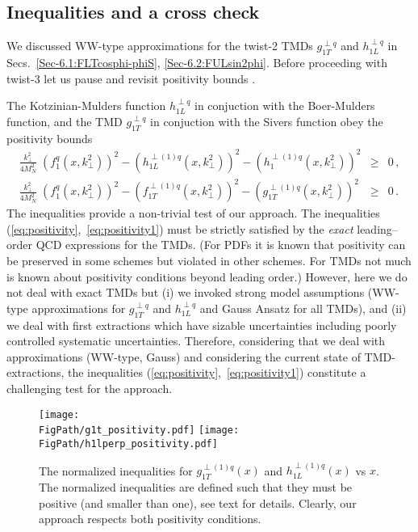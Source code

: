 \documentclass[a4paper,11pt]{article}
\newcommand{\blue}[1]{{\color{blue} #1}}
\newcommand{\ba}{\begin{eqnarray}}
\newcommand{\ea}{\end{eqnarray}}
\newcommand{\ps}[1]{\blue{ #1}}
\def\kperp{k_\perp}
\newcommand*{\FigPath}{./figs}%
\begin{document}
\ps{

\subsection{Inequalities and a cross check}

We discussed WW-type approximations for the twist-2 TMDs
$g^{\perp q}_{1T}$ and $h^{\perp q}_{1L}$ 
in Secs.~\ref{Sec-6.1:FLTcosphi-phiS}, \ref{Sec-6.2:FULsin2phi}.
Before proceeding with twist-3 let us pause and revisit positivity 
bounds \cite{Bacchetta:1999kz}. %

The Kotzinian-Mulders function $h^{\perp q}_{1L}$ in conjuction with 
the Boer-Mulders function, and the TMD $g^{\perp q}_{1T}$ in conjuction 
with the Sivers function obey the positivity bounds 
\cite{Bacchetta:1999kz}
\begin{subequations}\ba
	\frac{\kperp^2}{4M_N^2}\;(f_{1}^{q}(x,\kperp^2))^2 
	- (h^{\perp(1)q}_{1L}(x,\kperp^2))^2 
	- (h_{1}^{\perp(1)q}(x,\kperp^2))^2
	& \ge & 0\,, \label{eq:positivity}\\
	\frac{\kperp^2}{4M_N^2}\;(f_{1}^{q}(x,\kperp^2))^2 
	- (f_{1T}^{\perp(1)q}(x,\kperp^2))^2
	- (g^{\perp(1)q}_{1T}(x,\kperp^2))^2 
	& \ge & 0\,. \label{eq:positivity1}
\ea\end{subequations}
The inequalities provide a non-trivial test of our approach.
The inequalities (\ref{eq:positivity},~\ref{eq:positivity1}) 
must be strictly satisfied by the {\it exact} leading--order QCD 
expressions for the TMDs.  
(For PDFs it is known that positivity can be preserved in some 
schemes but violated in other schemes. For TMDs not much is 
known about positivity conditions beyond leading order.)
However, here we do not deal with exact TMDs but (i) we invoked 
strong model assumptions (WW-type approximations for $g^{\perp q}_{1T}$ 
and $h^{\perp q}_{1L}$ and Gauss Ansatz for all TMDs), and (ii) we deal 
with first extractions which have sizable uncertainties including 
poorly controlled systematic uncertainties.
Therefore, considering that we deal with approximations 
(WW-type, Gauss) and considering the current state of TMD-extractions, 
the inequalities (\ref{eq:positivity},~\ref{eq:positivity1}) constitute
a challenging test for the approach.

\begin{figure}[b!]
\centering
\texttt{[image: \\FigPath/g1t\_positivity.pdf]}  \quad
\texttt{[image: \\FigPath/h1lperp\_positivity.pdf]}  
	\caption{\label{h1l_pos} 
	The normalized inequalities for $g^{\perp(1)q}_{1T}(x)$ and
	$h^{\perp(1)q}_{1L}(x)$ vs $x$. The normalized inequalities
	are defined such that they must be positive (and smaller
	than one), see text for details. Clearly, our approach
	respects both positivity conditions.}
\end{figure}

}
\end{document}
